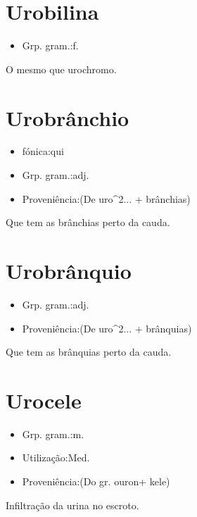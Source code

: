 \documentclass{article}
\begin{document}
\section{Urobilina}
\begin{itemize}
\item {Grp. gram.:f.}
\end{itemize}
O mesmo que \textunderscore urochromo\textunderscore .
\section{Urobrânchio}
\begin{itemize}
\item {fónica:qui}
\end{itemize}
\begin{itemize}
\item {Grp. gram.:adj.}
\end{itemize}
\begin{itemize}
\item {Proveniência:(De \textunderscore uro\textunderscore ^2... + \textunderscore brânchias\textunderscore )}
\end{itemize}
Que tem as brânchias perto da cauda.
\section{Urobrânquio}
\begin{itemize}
\item {Grp. gram.:adj.}
\end{itemize}
\begin{itemize}
\item {Proveniência:(De \textunderscore uro\textunderscore ^2... + \textunderscore brânquias\textunderscore )}
\end{itemize}
Que tem as brânquias perto da cauda.
\section{Urocele}
\begin{itemize}
\item {Grp. gram.:m.}
\end{itemize}
\begin{itemize}
\item {Utilização:Med.}
\end{itemize}
\begin{itemize}
\item {Proveniência:(Do gr. \textunderscore ouron\textunderscore  + \textunderscore kele\textunderscore )}
\end{itemize}
Infiltração da urina no escroto.
\end{document}
